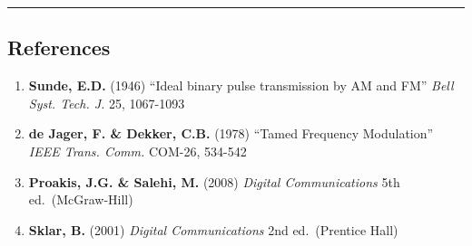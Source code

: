 \begin{center}\rule{0.5\linewidth}{0.5pt}\end{center}

\subsection{\texorpdfstring{ References}{ References}}\label{references}

\begin{enumerate}
\def\labelenumi{\arabic{enumi}.}
\tightlist
\item
  \textbf{Sunde, E.D.} (1946) ``Ideal binary pulse transmission by AM
  and FM'' \emph{Bell Syst. Tech. J.} 25, 1067-1093
\item
  \textbf{de Jager, F. \& Dekker, C.B.} (1978) ``Tamed Frequency
  Modulation'' \emph{IEEE Trans. Comm.} COM-26, 534-542
\item
  \textbf{Proakis, J.G. \& Salehi, M.} (2008) \emph{Digital
  Communications} 5th ed.~(McGraw-Hill)
\item
  \textbf{Sklar, B.} (2001) \emph{Digital Communications} 2nd
  ed.~(Prentice Hall)
\end{enumerate}
